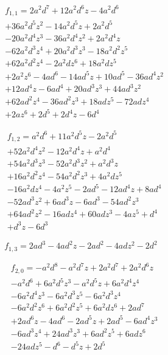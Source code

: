 \begin{equation}\begin{aligned}&f_{1,1}=2 a^{2} d^{7} + 12 a^{2} d^{6} z - 4 a^{2} d^{6} \\&+ 36 a^{2} d^{5} z^{2} - 14 a^{2} d^{5} z + 2 a^{2} d^{5} \\&- 20 a^{2} d^{4} z^{3} - 36 a^{2} d^{4} z^{2} + 2 a^{2} d^{4} z \\&- 62 a^{2} d^{3} z^{4} + 20 a^{2} d^{3} z^{3} - 18 a^{2} d^{2} z^{5} \\&+ 62 a^{2} d^{2} z^{4} - 2 a^{2} d z^{6} + 18 a^{2} d z^{5} \\&+ 2 a^{2} z^{6} - 4 a d^{6} - 14 a d^{5} z + 10 a d^{5} - 36 a d^{4} z^{2} \\&+ 12 a d^{4} z - 6 a d^{4} + 20 a d^{3} z^{3} + 44 a d^{3} z^{2} \\&+ 62 a d^{2} z^{4} - 36 a d^{2} z^{3} + 18 a d z^{5} - 72 a d z^{4} \\&+ 2 a z^{6} + 2 d^{5} + 2 d^{4} z - 6 d^{4}\end{aligned}\end{equation}

\begin{equation}\begin{aligned}&f_{1,2}=a^{2} d^{6} + 11 a^{2} d^{5} z - 2 a^{2} d^{5} \\&+ 52 a^{2} d^{4} z^{2} - 12 a^{2} d^{4} z + a^{2} d^{4} \\&+ 54 a^{2} d^{3} z^{3} - 52 a^{2} d^{3} z^{2} + a^{2} d^{3} z \\&+ 16 a^{2} d^{2} z^{4} - 54 a^{2} d^{2} z^{3} + 4 a^{2} d z^{5} \\&- 16 a^{2} d z^{4} - 4 a^{2} z^{5} - 2 a d^{5} - 12 a d^{4} z + 8 a d^{4} \\&- 52 a d^{3} z^{2} + 6 a d^{3} z - 6 a d^{3} - 54 a d^{2} z^{3} \\&+ 64 a d^{2} z^{2} - 16 a d z^{4} + 60 a d z^{3} - 4 a z^{5} + d^{4} \\&+ d^{3} z - 6 d^{3}\end{aligned}\end{equation}

\begin{equation}f_{1,3}=2 a d^{3} - 4 a d^{2} z - 2 a d^{2} - 4 a d z^{2} - 2 d^{2}\end{equation}

\begin{equation}\begin{aligned}&f_{2,0}=- a^{2} d^{8} - a^{2} d^{7} z + 2 a^{2} d^{7} + 2 a^{2} d^{6} z \\&- a^{2} d^{6} + 6 a^{2} d^{5} z^{3} - a^{2} d^{5} z + 6 a^{2} d^{4} z^{4} \\&- 6 a^{2} d^{4} z^{3} - 6 a^{2} d^{3} z^{5} - 6 a^{2} d^{3} z^{4} \\&- 6 a^{2} d^{2} z^{6} + 6 a^{2} d^{2} z^{5} + 6 a^{2} d z^{6} + 2 a d^{7} \\&+ 2 a d^{6} z - 4 a d^{6} - 2 a d^{5} z + 2 a d^{5} - 6 a d^{4} z^{3} \\&- 6 a d^{3} z^{4} + 24 a d^{3} z^{3} + 6 a d^{2} z^{5} + 6 a d z^{6} \\&- 24 a d z^{5} - d^{6} - d^{5} z + 2 d^{5}\end{aligned}\end{equation}

